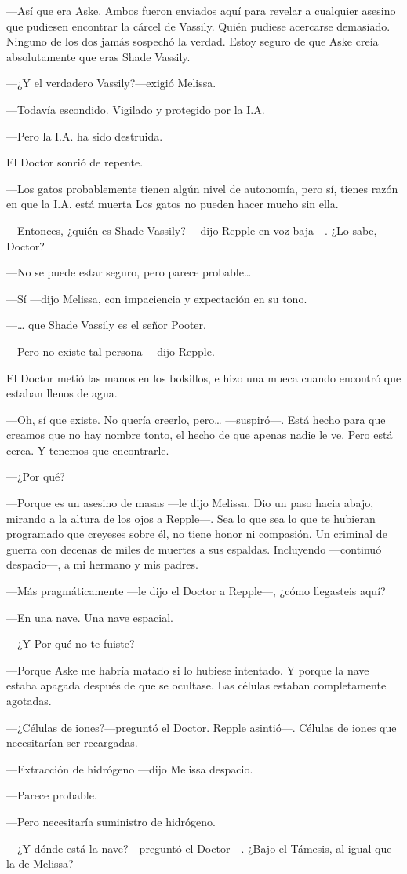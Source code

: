 {---Así que era Aske. Ambos fueron enviados aquí para revelar a
	cualquier asesino que pudiesen encontrar la cárcel de Vassily. Quién
	pudiese acercarse demasiado. Ninguno de los dos jamás sospechó la
	verdad. Estoy seguro de que Aske creía absolutamente que eras Shade
Vassily.}

{---¿Y el verdadero Vassily?---exigió Melissa.}

{---Todavía escondido. Vigilado y protegido por la I.A.}

{---Pero la I.A. ha sido destruida.}

{El Doctor sonrió de repente.}

{---Los gatos probablemente tienen algún nivel de autonomía, pero sí,
	tienes razón en que la I.A. está muerta Los gatos no pueden hacer mucho
sin ella.}

{---Entonces, ¿quién es Shade Vassily? ---dijo Repple en voz baja---.
¿Lo sabe, Doctor?}

{---No se puede estar seguro, pero parece probable\ldots{}}

{---Sí ---dijo Melissa, con impaciencia y expectación en su tono.}

{---\ldots{} que Shade Vassily es el señor Pooter.}

{---Pero no existe tal persona ---dijo Repple.}

{El Doctor metió las manos en los bolsillos, e hizo una mueca cuando
encontró que estaban llenos de agua.}

{---Oh, sí que existe. No quería creerlo, pero\ldots{} ---suspiró---.
	Está hecho para que creamos que no hay nombre tonto, el hecho de que
apenas nadie le ve. Pero está cerca. Y tenemos que encontrarle.}

{---¿Por qué?}

{---Porque es un asesino de masas ---le dijo Melissa. Dio un paso hacia
	abajo, mirando a la altura de los ojos a Repple---. Sea lo que sea lo
	que te hubieran programado que creyeses sobre él, no tiene honor ni
	compasión. Un criminal de guerra con decenas de miles de muertes a sus
	espaldas. Incluyendo ---continuó despacio---, a mi hermano y mis
padres.}

{---Más pragmáticamente ---le dijo el Doctor a Repple---, ¿cómo
llegasteis aquí?}

{---En una nave. Una nave espacial.}

{---¿Y Por qué no te fuiste?}

{---Porque Aske me habría matado si lo hubiese intentado. Y porque la
	nave estaba apagada después de que se ocultase. Las células estaban
completamente agotadas.}

{---¿Células de iones?---preguntó el Doctor. Repple asintió---. Células
de iones que necesitarían ser recargadas.}

{---Extracción de hidrógeno ---dijo Melissa despacio.}

{---Parece probable.}

{---Pero necesitaría suministro de hidrógeno.}

{---¿Y dónde está la nave?---preguntó el Doctor---. ¿Bajo el Támesis, al
igual que la de Melissa?}
